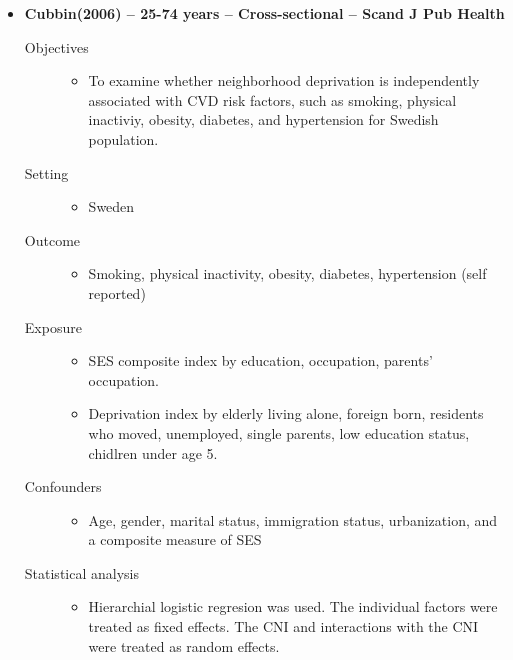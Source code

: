 \documentclass{article}
\begin{document}
\begin{itemize}
	\item{\bf Cubbin(2006) -- 25-74 years --  Cross-sectional -- Scand J Pub Health} 
		\begin{description}
			\item[Objectives]\mbox{}\par
				\begin{itemize}
					\item To examine whether neighborhood deprivation is independently associated with CVD risk factors, such as smoking, physical inactiviy, obesity, diabetes, and hypertension for Swedish population. 
				\end{itemize}
			\item[Setting] \mbox{}\par
				\begin{itemize}
					\item Sweden 
				\end{itemize}
			\item[Outcome]\mbox{}\par
				\begin{itemize}
					\item Smoking, physical inactivity, obesity, diabetes, hypertension (self reported)
				\end{itemize}
			\item[Exposure] \mbox{}\par
				\begin{itemize}
					\item SES composite index by education, occupation, parents' occupation. 
					\item Deprivation index by elderly living alone, foreign born, residents who moved, unemployed, single parents, low education status, chidlren under age 5.
				\end{itemize}
			\item[Confounders] \mbox{}\par
				\begin{itemize}
					\item Age, gender, marital status, immigration status, urbanization, and a composite measure of SES
				\end{itemize}
			\item[Statistical analysis] \mbox{}\par
				\begin{itemize}
					\item Hierarchial logistic regresion was used. The individual factors were treated as fixed effects. The CNI and interactions with the CNI were treated as random effects.

\end{itemize}
\end{description}
\end{itemize}
\end{document}
